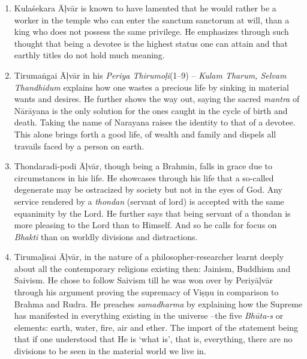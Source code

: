 \begin{enumerate}[{\rm 1.}]
 \item Kulaśekara Āḷvār is known to have lamented that he would rather be a worker in the temple who can enter the sanctum sanctorum at will, than a king who does not possess the same privilege. He emphasizes through such thought that being a devotee is the highest status one can attain and that earthly titles do not hold much meaning.

 \item Tirumaṅgai Āḷvār in his \textit{Periya Thirumoḷi}(1–9) – \textit{Kulam Tharum, Selvam Thandhidum }explains how one wastes a precious life by sinking in material wants and desires. He further shows the way out, saying the sacred \textit{mantra} of Nārāyana is the only solution for the ones caught in the cycle of birth and death. Taking the name of Narayana raises the identity to that of a devotee. This alone brings forth a good life, of wealth and family and dispels all travails faced by a person on earth.

 \item Thondaradi-podi Āḷvār, though being a Brahmin, falls in grace due to circumstances in his life. He showcases through his life that a so-called degenerate may be ostracized by society but not in the eyes of God. Any service rendered by a \textit{thondan }(servant of lord) is accepted with the same equanimity by the Lord. He further says that being servant of a thondan is more pleasing to the Lord than to Himself. And so he calls for focus on \textit{Bhakti} than on worldly divisions and distractions.

 \item Tirumaḷisai Āḷvār, in the nature of a philosopher-researcher learnt deeply about all the contemporary religions existing then: Jainism, Buddhism and Saivism. He chose to follow Saivism till he was won over by Periyāḷvār through his argument proving the supremacy of Viṣṇu in comparison to Brahma and Rudra. He preaches \textit{samadharma} by explaining how the Supreme has manifested in everything existing in the universe –the five \textit{Bhūta-s} or elements: earth, water, fire, air and ether. The import of the statement being that if one understood that He is ‘what is’, that is, everything, there are no divisions to be seen in the material world we live in.


\end{enumerate}
